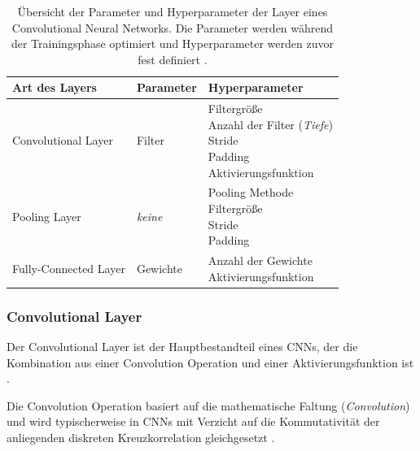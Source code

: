 \begin{table}[bh]
	\centering
	\caption{Übersicht der Parameter und Hyperparameter der Layer eines Convolutional Neural Networks. Die Parameter werden während der Trainingsphase optimiert und Hyperparameter werden zuvor fest definiert \cite{yamashitaConvolutionalNeuralNetworks2018}. }
	\begin{tabularx}{1.0\textwidth}{X X X}
		\textbf{Art des Layers} & \textbf{Parameter} & \textbf{Hyperparameter}\\
		\hline
		Convolutional Layer & Filter & \makecell[tl]{
			Filtergröße\\
			Anzahl der Filter (\textit{Tiefe})\\
			Stride\\
			Padding\\
			Aktivierungsfunktion
		}\\
		\hline
		Pooling Layer & \textit{keine} & \makecell[tl]{
			Pooling Methode\\
			Filtergröße\\
			Stride\\
			Padding
		}\\
		\hline
		Fully-Connected Layer & Gewichte & \makecell[tl]{
			Anzahl der Gewichte\\
			Aktivierungsfunktion
		}\\
		\hline
	\end{tabularx}
	\label{tab:layer_param}
\end{table}

\subsubsection{Convolutional Layer}
Der Convolutional Layer ist der Hauptbestandteil eines CNNs, der die Kombination aus einer Convolution Operation und einer Aktivierungsfunktion ist \cite{yamashitaConvolutionalNeuralNetworks2018}.

Die Convolution Operation basiert auf die mathematische Faltung (\textit{Convolution}) und wird typischerweise in CNNs mit Verzicht auf die Kommutativität der anliegenden diskreten Kreuzkorrelation gleichgesetzt \cite{goodfellowDeepLearning2016}.

